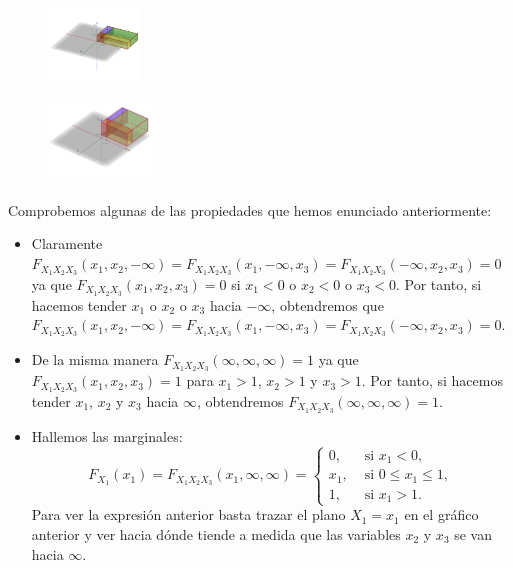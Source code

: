 \documentclass[]{book}
\begin{document}
\begin{figure}

{\centering \includegraphics[width=0.94in]{Images/Ej3DFxyz} 

}

\end{figure}
\begin{figure}

{\centering \includegraphics[width=1.08in]{Images/Ej3DFxy2pis} 

}

\end{figure}

Comprobemos algunas de las propiedades que hemos enunciado anteriormente:

\begin{itemize}
\item
  Claramente \(F_{X_1X_2X_3}(x_1,x_2,-\infty)=F_{X_1X_2X_3}(x_1,-\infty,x_3)=F_{X_1X_2X_3}(-\infty,x_2,x_3)=0\) ya que \(F_{X_1X_2X_3}(x_1,x_2,x_3)=0\) si \(x_1<0\) o \(x_2<0\) o \(x_3<0\). Por tanto, si hacemos tender \(x_1\) o \(x_2\) o \(x_3\) hacia \(-\infty\), obtendremos que \(F_{X_1X_2X_3}(x_1,x_2,-\infty)=F_{X_1X_2X_3}(x_1,-\infty,x_3)=F_{X_1X_2X_3}(-\infty,x_2,x_3)=0\).
\item
  De la misma manera \(F_{X_1X_2X_3}(\infty,\infty,\infty)=1\) ya que \(F_{X_1X_2X_3}(x_1,x_2,x_3)=1\) para \(x_1>1\), \(x_2>1\) y \(x_3>1\). Por tanto, si hacemos tender \(x_1\), \(x_2\) y \(x_3\) hacia \(\infty\), obtendremos \(F_{X_1X_2X_3}(\infty,\infty,\infty)=1\).
\item
  Hallemos las marginales:
  \[
  F_{X_1}(x_1)=F_{X_1X_2X_3}(x_1,\infty,\infty)=\begin{cases}
  0, & \mbox{ si }x_1 < 0,\\
  x_1, & \mbox{ si } 0\leq x_1\leq 1,\\
  1, & \mbox{ si } x_1>1.
  \end{cases}
  \]
  Para ver la expresión anterior basta trazar el plano \(X_1=x_1\) en el gráfico anterior y ver hacia dónde tiende a medida que las variables \(x_2\) y \(x_3\) se van hacia \(\infty\).
\end{itemize}
\end{document}
